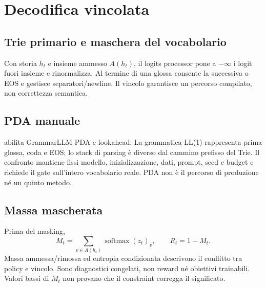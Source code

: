 \chapter{Decodifica vincolata}\label{chap:constraints}
\section{Trie primario e maschera del vocabolario}
Con storia $h_t$ e insieme ammesso $A(h_t)$, il logits processor pone a
$-\infty$ i logit fuori insieme e rinormalizza. Al termine di una glossa consente
la successiva o EOS e gestisce separatori/newline. Il vincolo garantisce un
percorso compilato, non correttezza semantica.

\section{PDA manuale}
 abilita GrammarLLM PDA e lookahead.
La grammatica LL(1) rappresenta prima glossa, coda e EOS; lo stack di parsing è
diverso dal cammino prefisso del Trie. Il confronto mantiene fissi modello,
inizializzazione, dati, prompt, seed e budget e richiede il gate sull'intero
vocabolario reale. PDA non è il percorso di produzione né un quinto metodo.

\section{Massa mascherata}
Prima del masking,
\begin{equation}M_t=\sum_{v\in A(h_t)}\operatorname{softmax}(z_t)_v,\qquad
R_t=1-M_t.\end{equation}
Massa ammessa/rimossa ed entropia condizionata descrivono il conflitto tra policy
e vincolo. Sono diagnostici congelati, non reward né obiettivi trainabili. Valori
bassi di $M_t$ non provano che il constraint corregga il significato.
